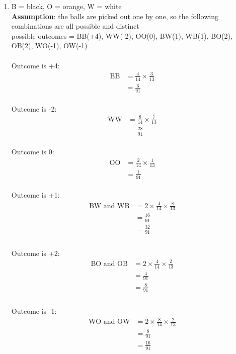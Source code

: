 \documentclass[a4paper, 12pt]{article}
\begin{document}
\begin{enumerate}
	\item B = black, O = orange, W = white
	\\
	\textbf{Assumption}: the balls are picked out one by 
	one, so the following combinations are all possible and distinct\\
	possible outcomes = BB(+4), WW(-2), OO(0), BW(1), WB(1), BO(2), 
	OB(2), WO(-1), OW(-1)\\
	\\
	Outcome is +4: 
	\begin{align*}
		\textrm{BB} &= \frac{4}{14} \times \frac{3}{13}\\
		&= \frac{6}{91}
	\end{align*}
	\\
	Outcome is -2: 
	\begin{align*}
		\textrm{WW} &= \frac{8}{14} \times \frac{7}{13}\\
		&= \frac{28}{91}
	\end{align*}
	\\
	Outcome is 0: 
	\begin{align*}
		\textrm{OO} &= \frac{2}{14} \times \frac{1}{13}\\
		&= \frac{1}{91}
	\end{align*}
	\\
	Outcome is +1: 
	\begin{align*}
		\textrm{BW and WB} &= 2\times\frac{4}{14} \times \frac{8}{13}\\
		&= \frac{16}{91}\\
		&= \frac{32}{91}\\
	\end{align*}
	\\
	Outcome is +2: 
	\begin{align*}
		\textrm{BO and OB} &= 2\times\frac{4}{14} \times \frac{2}{13}\\
		&= \frac{4}{91}\\
		&= \frac{8}{91}\\
	\end{align*}
	\\
	Outcome is -1: 
	\begin{align*}
		\textrm{WO and OW} &= 2\times\frac{8}{14} \times \frac{2}{13}\\
		&= \frac{8}{91}\\
		&= \frac{16}{91}\\
	\end{align*}
	

\end{enumerate}
\end{document}
